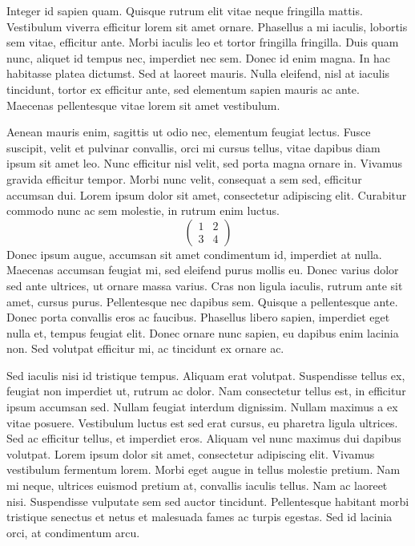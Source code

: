 \documentclass[12pt,a4paper,article]{memoir} %
\begin{document}
Integer id sapien quam. Quisque rutrum elit vitae neque fringilla mattis. Vestibulum viverra efficitur lorem sit amet ornare. Phasellus a mi iaculis, lobortis sem vitae, efficitur ante. Morbi iaculis leo et tortor fringilla fringilla. Duis quam nunc, aliquet id tempus nec, imperdiet nec sem. Donec id enim magna. In hac habitasse platea dictumst. Sed at laoreet mauris. Nulla eleifend, nisl at iaculis tincidunt, tortor ex efficitur ante, sed elementum sapien mauris ac ante. Maecenas pellentesque vitae lorem sit amet vestibulum.

Aenean mauris enim, sagittis ut odio nec, elementum feugiat lectus. Fusce suscipit, velit et pulvinar convallis, orci mi cursus tellus, vitae dapibus diam ipsum sit amet leo. Nunc efficitur nisl velit, sed porta magna ornare in. Vivamus gravida efficitur tempor. Morbi nunc velit, consequat a sem sed, efficitur accumsan dui. Lorem ipsum dolor sit amet, consectetur adipiscing elit. Curabitur commodo nunc ac sem molestie, in rutrum enim luctus.
$$
\left(
\begin{array}{cc}
1&2\\
3&4
\end{array}
\right)
$$
Donec ipsum augue, accumsan sit amet condimentum id, imperdiet at nulla. Maecenas accumsan feugiat mi, sed eleifend purus mollis eu. Donec varius dolor sed ante ultrices, ut ornare massa varius. Cras non ligula iaculis, rutrum ante sit amet, cursus purus. Pellentesque nec dapibus sem. Quisque a pellentesque ante. Donec porta convallis eros ac faucibus. Phasellus libero sapien, imperdiet eget nulla et, tempus feugiat elit. Donec ornare nunc sapien, eu dapibus enim lacinia non. Sed volutpat efficitur mi, ac tincidunt ex ornare ac.

Sed iaculis nisi id tristique tempus. Aliquam erat volutpat. Suspendisse tellus ex, feugiat non imperdiet ut, rutrum ac dolor. Nam consectetur tellus est, in efficitur ipsum accumsan sed. Nullam feugiat interdum dignissim. Nullam maximus a ex vitae posuere. Vestibulum luctus est sed erat cursus, eu pharetra ligula ultrices. Sed ac efficitur tellus, et imperdiet eros. Aliquam vel nunc maximus dui dapibus volutpat.
\newpage
Lorem ipsum dolor sit amet, consectetur adipiscing elit. Vivamus vestibulum fermentum lorem. Morbi eget augue in tellus molestie pretium. Nam mi neque, ultrices euismod pretium at, convallis iaculis tellus. Nam ac laoreet nisi. Suspendisse vulputate sem sed auctor tincidunt. Pellentesque habitant morbi tristique senectus et netus et malesuada fames ac turpis egestas. Sed id lacinia orci, at condimentum arcu.
\end{document}
